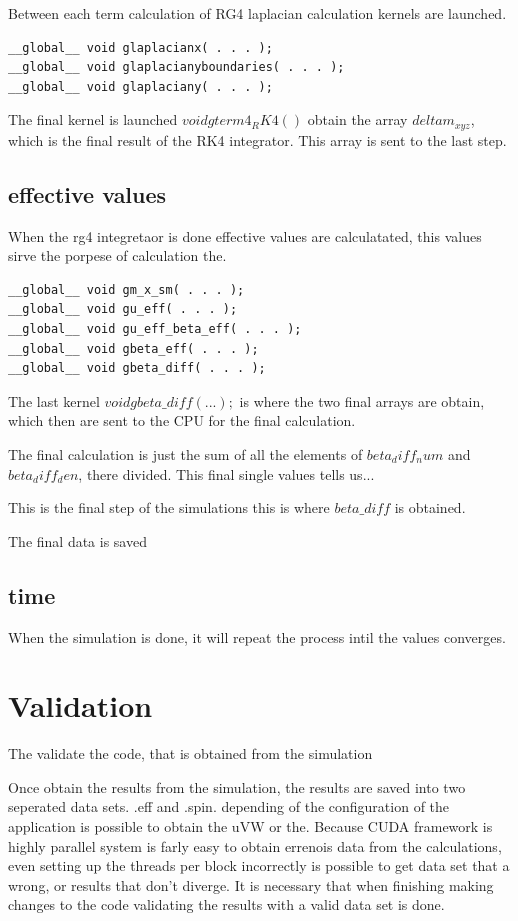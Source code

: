Between each term calculation of RG4 laplacian calculation kernels are launched.

\begin{lstlisting}[frame=none]
__global__ void glaplacianx( . . . );
__global__ void glaplacianyboundaries( . . . );
__global__ void glaplaciany( . . . );
\end{lstlisting}

The final kernel is launched $void gterm4_RK4()$ obtain the array $deltam_{xyz}$, which is the final result of the RK4 integrator. This array is sent to the last step.

\subsection{effective values}

When the rg4 integretaor is done effective values are calculatated, this values sirve the porpese of calculation  the.


\begin{lstlisting}[frame=none]
__global__ void gm_x_sm( . . . );
__global__ void gu_eff( . . . );
__global__ void gu_eff_beta_eff( . . . );
__global__ void gbeta_eff( . . . );
__global__ void gbeta_diff( . . . );
\end{lstlisting}

The last kernel $ void gbeta\_diff( . . . );$ is where the two final arrays are obtain,
which then are sent to the CPU for the final calculation.

The final calculation is just the sum of all the elements of $beta_diff_num$ and $beta_diff_den$, there divided.
This final single values tells us...


This is the final step of the simulations this is where $beta\_diff$ is obtained. 

The final data is saved
\subsection{time}

When the simulation is done, it will repeat the process intil the values converges.


\section{Validation}

The validate the code, that is obtained from the simulation

Once obtain the results from the simulation, the results are saved into two seperated data sets. .eff and .spin. depending of the configuration of the application is possible to obtain the uVW or the. Because CUDA framework is highly parallel system is farly easy to obtain errenois data from the calculations, even setting up the threads per block incorrectly is possible to get data set that a wrong, or results that don't diverge. It is necessary that when finishing making changes to the code validating the results with a valid data set is done.

